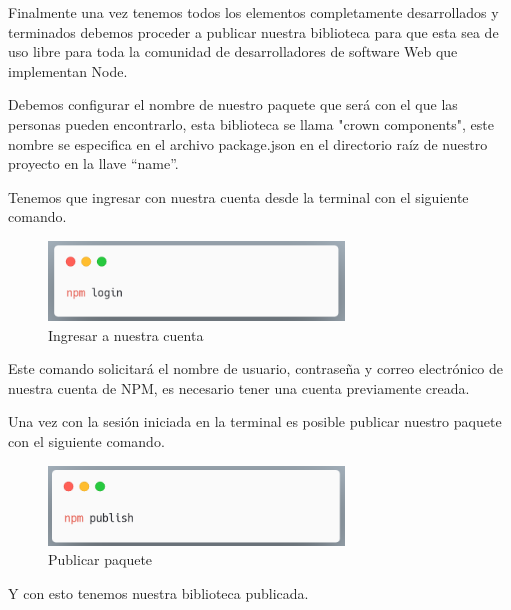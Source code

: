 Finalmente una vez tenemos todos los elementos completamente desarrollados y terminados debemos proceder a publicar nuestra biblioteca para que esta sea de uso libre para toda la comunidad de desarrolladores de software Web que implementan Node.

Debemos configurar el nombre de nuestro paquete que será con el que las personas pueden encontrarlo, esta biblioteca se llama "crown components", este nombre se especifica en el archivo package.json en el directorio raíz de nuestro proyecto en la llave “name”.

Tenemos que ingresar con nuestra cuenta desde la terminal con el siguiente comando.
  \newline
    \begin{figure}[H]
    \centering
    \includegraphics[width=0.7\textwidth]{./Imagenes/8.39.png}
    \caption[ingresar a nuestra cuenta]{Ingresar a nuestra cuenta}
    \end{figure}
    
    Este comando solicitará el nombre de usuario, contraseña y correo electrónico de nuestra cuenta de NPM, es necesario tener una cuenta previamente creada.

Una vez con la sesión iniciada en la terminal es posible publicar nuestro paquete con el siguiente comando.
  \newline
    \begin{figure}[H]
    \centering
    \includegraphics[width=0.7\textwidth]{./Imagenes/8.40.png}
    \caption[Publicar paquete]{Publicar paquete}
    \end{figure}
        Y con esto tenemos nuestra biblioteca publicada.
    \clearpage
    
